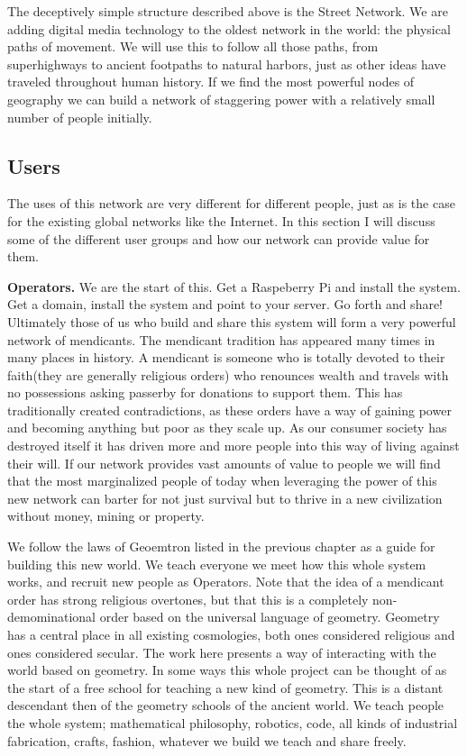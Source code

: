 The deceptively simple structure described above is the Street Network.  We are adding digital media technology to the oldest network in the world: the physical paths of movement.  We will use this to follow all those paths, from  superhighways to ancient footpaths to natural harbors, just as other ideas have traveled throughout human history.  If we find the most powerful nodes of geography we can build a network of staggering power with a relatively small number of people initially.


\subsection{Users}

The uses of this network are very different for different people, just as is the case for the existing global networks like the Internet. In this section I will discuss some of the different user groups and how our network can provide value for them.

\textbf{Operators.} We are the start of this.  Get a Raspeberry Pi and install the system. Get a domain, install the system and point to your server.  Go forth and share! Ultimately those of us who build and share this system will form a very powerful network of mendicants.  The mendicant tradition has appeared many times in many places in history.  A mendicant is someone who is totally devoted to their faith(they are generally religious orders) who renounces wealth and travels with no possessions asking passerby for donations to support them.  This has traditionally created contradictions, as these orders have a way of gaining power and becoming anything but poor as they scale up.  As our consumer society has destroyed itself it has driven more and more people into this way of living against their will.  If our network provides vast amounts of value to people we will find that the most marginalized people of today when leveraging the power of this new network can barter for not just survival but to thrive in a new civilization without money, mining or property.  

We follow the laws of Geoemtron listed in the previous chapter as a guide for building this new world.  We teach everyone we meet how this whole system works, and recruit new people as Operators.  Note that the idea of a mendicant order has strong religious overtones, but that this is a completely non-demominational order based on the universal language of geometry.  Geometry has a central place in all existing cosmologies, both ones considered religious and ones considered secular.  The work here presents a way of interacting with the world based on geometry.  In some ways this whole project can be thought of as the start of a free school for teaching a new kind of geometry.  This is a distant descendant then of the geometry schools of the ancient world.  We teach people the whole system; mathematical philosophy, robotics, code, all kinds of industrial fabrication, crafts, fashion, whatever we build we teach and share freely.  

